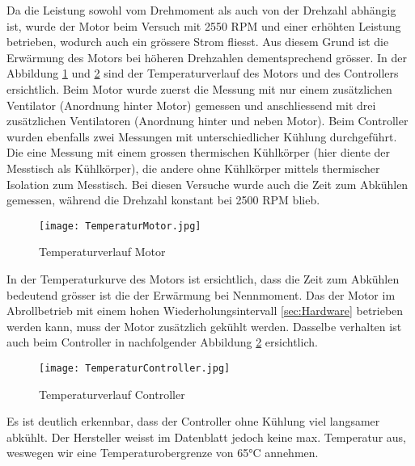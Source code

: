 Da die Leistung sowohl vom Drehmoment als auch von der Drehzahl abhängig ist, wurde  der Motor beim Versuch mit 2550 RPM und einer erhöhten Leistung betrieben, wodurch auch ein grössere Strom fliesst. Aus diesem Grund ist die Erwärmung des Motors bei höheren Drehzahlen dementsprechend grösser. In der Abbildung \ref{fig:TemperaturMotor} und \ref{fig:TemperaturController} sind der Temperaturverlauf des Motors und des Controllers ersichtlich. Beim Motor wurde zuerst die Messung mit nur einem zusätzlichen Ventilator (Anordnung hinter Motor) gemessen und anschliessend mit drei zusätzlichen Ventilatoren (Anordnung hinter und neben Motor). Beim Controller wurden ebenfalls zwei Messungen mit unterschiedlicher Kühlung durchgeführt. Die eine Messung mit einem grossen thermischen Kühlkörper (hier diente der Messtisch als Kühlkörper), die andere ohne Kühlkörper mittels thermischer Isolation zum Messtisch. Bei diesen Versuche wurde auch die Zeit zum Abkühlen gemessen, während die Drehzahl konstant bei 2500 RPM blieb.


\begin{figure}[H]
	\centering
	\texttt{[image: TemperaturMotor.jpg]}
	\caption{Temperaturverlauf Motor}\label{fig:TemperaturMotor}
\end{figure}

In der Temperaturkurve des Motors ist ersichtlich, dass die Zeit zum Abkühlen bedeutend grösser ist die der Erwärmung bei Nennmoment. Das der Motor im Abrollbetrieb mit einem hohen Wiederholungsintervall \ref{sec:Hardware} betrieben werden kann, muss der Motor zusätzlich gekühlt werden. Dasselbe verhalten ist auch beim Controller in nachfolgender Abbildung \ref{fig:TemperaturController} ersichtlich.

\begin{figure}[H]
	\centering
	\texttt{[image: TemperaturController.jpg]}
	\caption{Temperaturverlauf Controller}\label{fig:TemperaturController}
\end{figure}

Es ist deutlich erkennbar, dass der Controller ohne Kühlung viel langsamer abkühlt. Der Hersteller weisst im Datenblatt jedoch keine max. Temperatur \cite{ControllerUserGuide} aus, weswegen wir eine Temperaturobergrenze von 65°C annehmen.